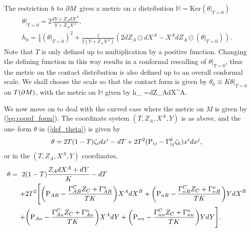 The restriction $h$ to $\partial M$ gives a metric on a distribution ${ \mathbb{H} }=\mbox{Ker} (\theta|_{T=0})$
\begin{gather}
\theta|_{T=0}=2\frac{dY+Z_A dX^A}{Y+Z_AX^A}, \nonumber \\
h_0=\frac{1}{4}{(\theta|_{T=0})}^2+\frac{1}{2(Y+Z_AX^A)}(2dZ_A\odot dX^A-X^AdZ_A\odot(\theta|_{T=0})). \label{h000}
\end{gather}
 Note that $T$ is only defined up to multiplication by a positive function. Changing the defining function in this way results in a conformal rescalling of $\theta|_{T=0}$, thus the metric on the contact distribution is also defined up to an overall conformal scale. We shall choose the scale so that
the contact form is given  by $\theta_0\equiv K\theta|_{T=0}$ on $T(\partial M)$,
with the metric on ${ \mathbb{H} }$ given by
\be
\label{on_distri}
h_{  }=dZ_A\odot dX^A.
\ee

We now move on to deal with the
curved case where the metric on $M$ is given by 
(\ref{eq:coord_form}).
The coordinate system $(T, Z_A, X^A, Y)$ is as above, and
the one--form $\theta$ in (\ref{def_theta}) is given by
\[
\theta=2T(1-T)\zeta_idx^i-dT+2T^2(\mathrm{P}_{ij}-\Gamma_{ij}^k\zeta_k)x^idx^j,
\]
or in the $(T, Z_A, X^A, Y)$ coordinates,
\[
\begin{split}
\theta=\ 2&(1-T)\frac{Z_AdX^A+dY}{K} - dT \\
+& 2T^2\Bigg[\bigg(\mathrm{P}_{AB}-\frac{\Gamma^C_{AB}Z_C+\Gamma^n_{AB}}{TK}\bigg)X^AdX^B 
+\bigg(\mathrm{P}_{nB}-\frac{\Gamma^C_{nB}Z_C+\Gamma^n_{nB}}{TK}\bigg)YdX^B \\
+& \bigg(\mathrm{P}_{An}-\frac{\Gamma^C_{An}Z_C+\Gamma^n_{An}}{TK}\bigg)X^AdY 
+\bigg(\mathrm{P}_{nn}-\frac{\Gamma^C_{nn}Z_C+\Gamma^n_{nn}}{TK}\bigg)YdY\Bigg].
\end{split}
\]

